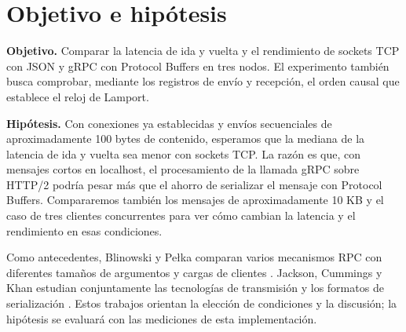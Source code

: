 \section{Objetivo e hipótesis}

\textbf{Objetivo.} Comparar la latencia de ida y vuelta y el rendimiento de
sockets TCP con JSON y gRPC con Protocol Buffers en tres nodos. El
experimento también busca comprobar, mediante los registros de envío y
recepción, el orden causal que establece el reloj de Lamport.

\textbf{Hipótesis.} Con conexiones ya establecidas y envíos secuenciales de
aproximadamente 100 bytes de contenido, esperamos que la mediana de la
latencia de ida y vuelta sea menor con sockets TCP. La razón es que, con
mensajes cortos en localhost, el procesamiento de la llamada gRPC sobre
HTTP/2 podría pesar más que el ahorro de serializar el mensaje con
Protocol Buffers. Compararemos también los mensajes de aproximadamente
10 KB y el caso de tres clientes concurrentes para ver cómo cambian la
latencia y el rendimiento en esas condiciones.

Como antecedentes, Blinowski y Pełka comparan varios mecanismos RPC con
diferentes tamaños de argumentos y cargas de clientes
\cite{blinowski2026rpc}. Jackson, Cummings y Khan estudian conjuntamente
las tecnologías de transmisión y los formatos de serialización
\cite{jackson2024streaming}. Estos trabajos orientan la elección de
condiciones y la discusión; la hipótesis se evaluará con las mediciones
de esta implementación.
